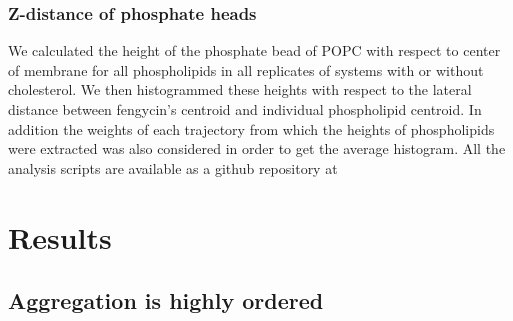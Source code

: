 \subsubsection{Z-distance of phosphate heads}
\label{sss:z-dist}
We calculated the height of the phosphate bead of POPC with respect to center of membrane for all phospholipids in all replicates of systems with or without cholesterol. We then histogrammed these heights with respect to the lateral distance between fengycin's centroid and individual phospholipid centroid. In addition the weights of each trajectory from which the heights of phospholipids were extracted was also considered in order to get the average histogram. 
All the analysis scripts are available as a github repository at 

\section{Results}
\label{s:results}
\subsection{Aggregation is highly ordered}
\label{ss:agg_ordered}

